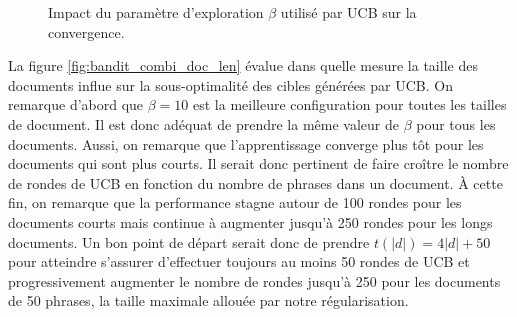 \begin{figure}[h!]
    \begin{center}
    \end{center}
    \caption{Impact du paramètre d'exploration $\beta$ utilisé par UCB sur la convergence.}
    \label{fig:bandit_combi_alpha}
\end{figure}

La figure \ref{fig:bandit_combi_doc_len} évalue dans quelle mesure la taille des documents
influe sur la sous-optimalité des cibles générées par UCB.
On remarque d'abord que $\beta=10$ est la meilleure configuration pour toutes les tailles
de document.
Il est donc adéquat de prendre la même valeur de $\beta$ pour tous les documents.
Aussi, on remarque que l'apprentissage converge plus tôt pour les documents qui sont
plus courts.
Il serait donc pertinent de faire croître le nombre de rondes de UCB en fonction du nombre de
phrases dans un document.
À cette fin, on remarque que la performance stagne autour de 100 rondes pour les documents 
courts mais continue à augmenter jusqu'à 250 rondes pour les longs documents.
Un bon point de départ serait donc de prendre $t(|d|) = 4 |d| + 50$ pour atteindre s'assurer 
d'effectuer toujours au moins 50 rondes de UCB et progressivement augmenter le nombre de rondes 
jusqu'à 250 pour les documents de 50 phrases, la taille maximale
allouée par notre régularisation.

